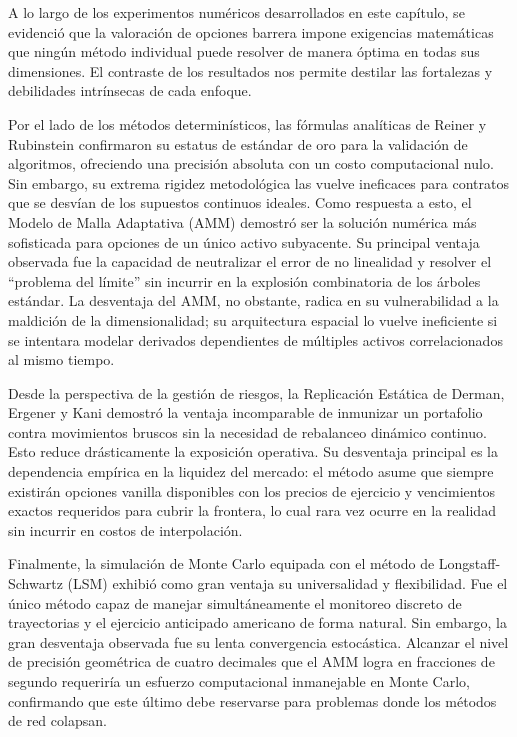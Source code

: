 A lo largo de los experimentos numéricos desarrollados en este capítulo, se evidenció que la valoración de opciones barrera impone exigencias matemáticas que ningún método individual puede resolver de manera óptima en todas sus dimensiones. El contraste de los resultados nos permite destilar las fortalezas y debilidades intrínsecas de cada enfoque.

Por el lado de los métodos determinísticos, las fórmulas analíticas de Reiner y Rubinstein confirmaron su estatus de estándar de oro para la validación de algoritmos, ofreciendo una precisión absoluta con un costo computacional nulo. Sin embargo, su extrema rigidez metodológica las vuelve ineficaces para contratos que se desvían de los supuestos continuos ideales. Como respuesta a esto, el Modelo de Malla Adaptativa (AMM) demostró ser la solución numérica más sofisticada para opciones de un único activo subyacente. Su principal ventaja observada fue la capacidad de neutralizar el error de no linealidad y resolver el ``problema del límite'' sin incurrir en la explosión combinatoria de los árboles estándar. La desventaja del AMM, no obstante, radica en su vulnerabilidad a la maldición de la dimensionalidad; su arquitectura espacial lo vuelve ineficiente si se intentara modelar derivados dependientes de múltiples activos correlacionados al mismo tiempo.

Desde la perspectiva de la gestión de riesgos, la Replicación Estática de Derman, Ergener y Kani demostró la ventaja incomparable de inmunizar un portafolio contra movimientos bruscos sin la necesidad de rebalanceo dinámico continuo. Esto reduce drásticamente la exposición operativa. Su desventaja principal es la dependencia empírica en la liquidez del mercado: el método asume que siempre existirán opciones vanilla disponibles con los precios de ejercicio y vencimientos exactos requeridos para cubrir la frontera, lo cual rara vez ocurre en la realidad sin incurrir en costos de interpolación.

Finalmente, la simulación de Monte Carlo equipada con el método de Longstaff-Schwartz (LSM) exhibió como gran ventaja su universalidad y flexibilidad. Fue el único método capaz de manejar simultáneamente el monitoreo discreto de trayectorias y el ejercicio anticipado americano de forma natural. Sin embargo, la gran desventaja observada fue su lenta convergencia estocástica. Alcanzar el nivel de precisión geométrica de cuatro decimales que el AMM logra en fracciones de segundo requeriría un esfuerzo computacional inmanejable en Monte Carlo, confirmando que este último debe reservarse para problemas donde los métodos de red colapsan.

